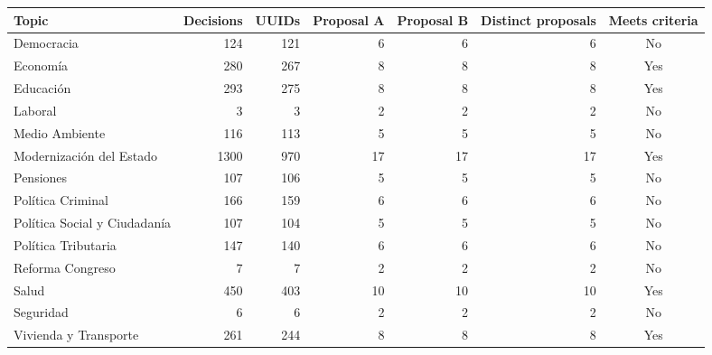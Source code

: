 \begin{tabular}{lrrrrrc}
\toprule
Topic & Decisions & UUIDs & Proposal A & Proposal B & Distinct proposals & Meets criteria \\
\midrule
Democracia & 124 & 121 & 6 & 6 & 6 & No \\
Economía & 280 & 267 & 8 & 8 & 8 & Yes \\
Educación & 293 & 275 & 8 & 8 & 8 & Yes \\
Laboral & 3 & 3 & 2 & 2 & 2 & No \\
Medio Ambiente & 116 & 113 & 5 & 5 & 5 & No \\
Modernización del Estado & 1300 & 970 & 17 & 17 & 17 & Yes \\
Pensiones & 107 & 106 & 5 & 5 & 5 & No \\
Política Criminal & 166 & 159 & 6 & 6 & 6 & No \\
Política Social y Ciudadanía & 107 & 104 & 5 & 5 & 5 & No \\
Política Tributaria & 147 & 140 & 6 & 6 & 6 & No \\
Reforma Congreso & 7 & 7 & 2 & 2 & 2 & No \\
Salud & 450 & 403 & 10 & 10 & 10 & Yes \\
Seguridad & 6 & 6 & 2 & 2 & 2 & No \\
Vivienda y Transporte & 261 & 244 & 8 & 8 & 8 & Yes \\
\bottomrule
\end{tabular}
